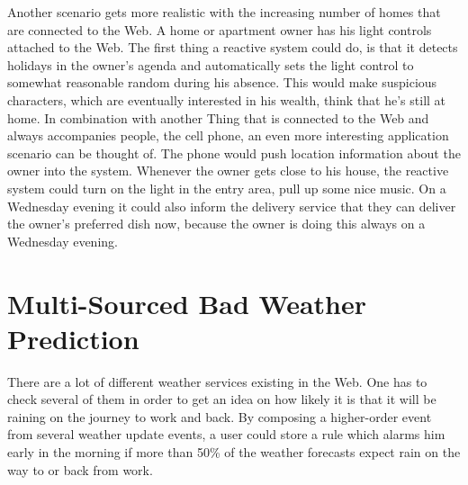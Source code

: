Another scenario gets more realistic with the increasing number of homes that are connected to the Web.
A home or apartment owner has his light controls attached to the Web.
The first thing a reactive system could do, is that it detects holidays in the owner's agenda and automatically sets the light control to somewhat reasonable random during his absence.
This would make suspicious characters, which are eventually interested in his wealth, think that he's still at home.
In combination with another \textrm{Thing} that is connected to the Web and always accompanies people, the cell phone, an even more interesting application scenario can be thought of.
The phone would push location information about the owner into the system.
Whenever the owner gets close to his house, the reactive system could turn on the light in the entry area, pull up some nice music.
On a Wednesday evening it could also inform the delivery service that they can deliver the owner's preferred dish now, because the owner is doing this always on a Wednesday evening.




\section{Multi-Sourced Bad Weather Prediction}
There are a lot of different weather services existing in the Web.
One has to check several of them in order to get an idea on how likely it is that it will be raining on the journey to work and back.
By composing a higher-order event from several weather update events, a user could store a rule which alarms him early in the morning if more than 50\% of the weather forecasts expect rain on the way to or back from work.